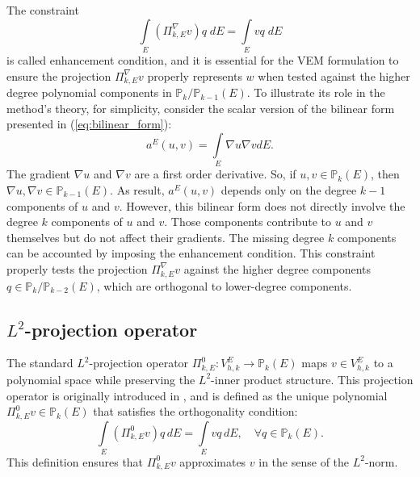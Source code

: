 \documentclass{article}
\begin{document}
The constraint
\begin{equation}\label{eq:enhancement_condition}
    \int \limits_E \left( \Pi^{\nabla}_{k,E} v \right) q\;dE = \int \limits_E vq \; dE
\end{equation}
is called enhancement condition, and it is essential for the VEM formulation to ensure the projection $\Pi^\nabla_{k,E} v$ properly represents $w$ when tested against the higher degree polynomial components in $\mathbb{P}_{k}/\mathbb{P}_{k-1}(E)$. To illustrate its role in the method's theory, for simplicity, consider the scalar version of the bilinear form presented in (\ref{eq:bilinear_form}):
\begin{equation}\label{eq:continuous_bilinear_stiff}
    \nonumber
    a^E(u,v) = \int \limits_E \nabla u \nabla v dE.
\end{equation}
The gradient $\nabla u$ and $\nabla v$ are a first order derivative. So, if $u,v \in \mathbb{P}_k(E)$, then $\nabla u, \nabla v\in \mathbb{P}_{k-1}(E)$. As result, $a^E(u,v)$ depends only on the degree $k-1$ components of $u$ and $v$. However, this bilinear form does not directly involve the degree $k$ components of $u$ and $v$. Those components contribute to $u$ and $v$ themselves but do not affect their gradients. The missing degree $k$ components can be accounted by imposing the enhancement condition. This constraint properly tests the projection $\Pi^\nabla_{k,E} v$ against the higher degree components $q \in \mathbb{P}_k / \mathbb{P}_{k-2}(E)$, which are orthogonal to lower-degree components.


\subsection[L2-projection operator]{$L^2$-projection operator}
\label{sec:l2_projection}

The standard $L^2$-projection operator $\Pi^0_{k,E}: V_{h,k}^E \longrightarrow \mathbb{P}_k(E)$ maps $v \in V_{h,k}^E$ to a polynomial space while preserving the $L^2$-inner product structure. This projection operator is originally introduced in \cite{ahmad2013projectors}, and is defined as the unique polynomial $\Pi^0_{k,E} v \in \mathbb{P}_k(E)$ that satisfies the orthogonality condition:
\begin{equation}\label{eq:l2_projection_def}
    \int \limits_E \left( \Pi^0_{k,E} v \right) q \, dE = \int \limits_E v q \, dE, \quad \forall q \in \mathbb{P}_k(E).
\end{equation}
This definition ensures that $\Pi^0_{k,E} v$ approximates $v$ in the sense of the $L^2$-norm.
\end{document}
